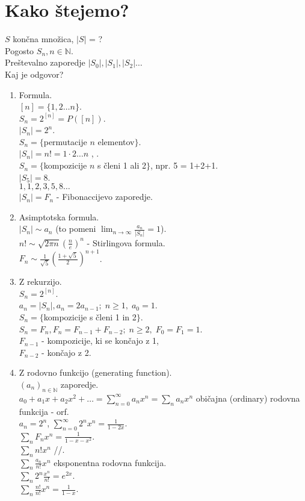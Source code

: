 \documentclass[a4paper, 12pt]{book}
\theoremstyle{definition}
\theoremstyle{remark}
\newcommand{\N}{\mathbb{N}}
\begin{document}
\section{Kako štejemo?}

$S$ končna množica, $|S|$ = ? \\
Pogosto $S_n, n \in \N$. \\
Preštevalno zaporedje $|S_0|, |S_1|, |S_2| \dots$ \\
Kaj je odgovor?

\begin{enumerate}[label=(\arabic{*})]
  \item Formula. \\
    $[n] = \{1, 2 \dots n\}$. \\
    $S_n = 2^{[n]} = P([n])$. \\
    $|S_n| = 2^n$. \\
    $S_n = \{$permutacije $n$ elementov$\}$. \\
    $|S_n| = n! = 1 \cdot 2 \ldots n$ , . \\
    $S_n = \{$kompozicije $n$ s členi 1 ali 2$\}$, npr. 5 = 1+2+1. \\
    $|S_5| = 8$. \\
    $1, 1, 2, 3, 5, 8 \dots$ \\
    $|S_n| = F_n$ - Fibonaccijevo zaporedje.
  \item Asimptotska formula. \\
    $|S_n| \sim a_n$ (to pomeni $\lim_{n \to \infty} \frac{a_n}{|S_n|} = 1$). \\
    $n! \sim \sqrt{2 \pi n} \left(\frac{n}{e}\right)^n$ - Stirlingova formula. \\
    $F_n \sim \frac{1}{\sqrt{5}} \left(\frac{1+\sqrt{5}}{2}\right)^{n+1}$.
  \item Z rekurzijo. \\
    $S_n = 2^{[n]}$. \\
    $a_n = |S_n|, a_n = 2a_{n-1}; \; n \geq 1, \; a_0 = 1$. \\
    $S_n = \{$kompozicije s členi 1 in 2$\}$. \\
    $S_n = F_n, F_n = F_{n-1} + F_{n-2}; \; n \geq 2, \; F_0 = F_1 = 1$. \\
    $F_{n-1}$ - kompozicije, ki se končajo z 1, \\
    $F_{n-2}$ - končajo z 2.
  \item Z rodovno funkcijo (generating function). \\
    $(a_n)_{n \in \N}$ zaporedje. \\
    $a_0 + a_1 x + a_2 x^2 + \dots = \sum_{n=0}^{\infty} a_n x^n = \sum_n a_n x^n$
      običajna (ordinary) rodovna funkcija - orf. \\
    $a_n = 2^n$, $\sum_{n=0}^{\infty} 2^n x^n = \frac{1}{1-2x}$. \\
    $\sum_n F_n x^n = \frac{1}{1-x-x^2}$. \\
    $\sum_n n! x^n$ //. \\
    $\sum_n \frac{a_n}{n!} x^n$ eksponentna rodovna funkcija. \\
    $\sum_n 2^n \frac{x^n}{n!} = e^{2x}$. \\
    $\sum_n \frac{n!}{n!} x^n = \frac{1}{1-x}$.
\end{enumerate}
\end{document}
